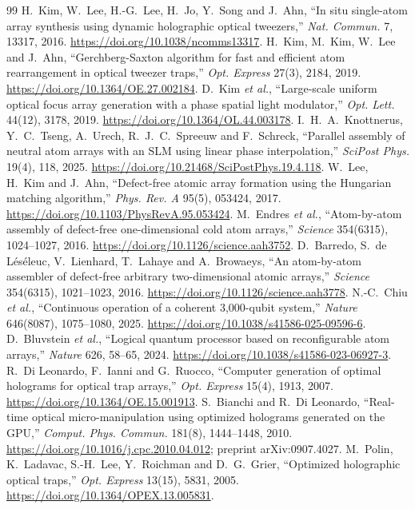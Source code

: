 \begin{thebibliography}{99}\small
{} H.~Kim, W.~Lee, H.-G.~Lee, H.~Jo, Y.~Song and J.~Ahn, ``In situ single-atom array synthesis using dynamic holographic optical tweezers,'' \emph{Nat. Commun.} 7, 13317, 2016. \url{https://doi.org/10.1038/ncomms13317}.
 H.~Kim, M.~Kim, W.~Lee and J.~Ahn, ``Gerchberg-Saxton algorithm for fast and efficient atom rearrangement in optical tweezer traps,'' \emph{Opt. Express} 27(3), 2184, 2019. \url{https://doi.org/10.1364/OE.27.002184}.
 D.~Kim \emph{et al.}, ``Large-scale uniform optical focus array generation with a phase spatial light modulator,'' \emph{Opt. Lett.} 44(12), 3178, 2019. \url{https://doi.org/10.1364/OL.44.003178}.
 I.~H.~A.~Knottnerus, Y.~C.~Tseng, A.~Urech, R.~J.~C.~Spreeuw and F.~Schreck, ``Parallel assembly of neutral atom arrays with an SLM using linear phase interpolation,'' \emph{SciPost Phys.} 19(4), 118, 2025. \url{https://doi.org/10.21468/SciPostPhys.19.4.118}.
 W.~Lee, H.~Kim and J.~Ahn, ``Defect-free atomic array formation using the Hungarian matching algorithm,'' \emph{Phys. Rev. A} 95(5), 053424, 2017. \url{https://doi.org/10.1103/PhysRevA.95.053424}.
 M.~Endres \emph{et al.}, ``Atom-by-atom assembly of defect-free one-dimensional cold atom arrays,'' \emph{Science} 354(6315), 1024--1027, 2016. \url{https://doi.org/10.1126/science.aah3752}.
 D.~Barredo, S.~de L\'es\'eleuc, V.~Lienhard, T.~Lahaye and A.~Browaeys, ``An atom-by-atom assembler of defect-free arbitrary two-dimensional atomic arrays,'' \emph{Science} 354(6315), 1021--1023, 2016. \url{https://doi.org/10.1126/science.aah3778}.
 N.-C.~Chiu \emph{et al.}, ``Continuous operation of a coherent 3,000-qubit system,'' \emph{Nature} 646(8087), 1075--1080, 2025. \url{https://doi.org/10.1038/s41586-025-09596-6}.
 D.~Bluvstein \emph{et al.}, ``Logical quantum processor based on reconfigurable atom arrays,'' \emph{Nature} 626, 58--65, 2024. \url{https://doi.org/10.1038/s41586-023-06927-3}.
 R.~Di Leonardo, F.~Ianni and G.~Ruocco, ``Computer generation of optimal holograms for optical trap arrays,'' \emph{Opt. Express} 15(4), 1913, 2007. \url{https://doi.org/10.1364/OE.15.001913}.
 S.~Bianchi and R.~Di Leonardo, ``Real-time optical micro-manipulation using optimized holograms generated on the GPU,'' \emph{Comput. Phys. Commun.} 181(8), 1444--1448, 2010. \url{https://doi.org/10.1016/j.cpc.2010.04.012}; preprint arXiv:0907.4027.
 M.~Polin, K.~Ladavac, S.-H.~Lee, Y.~Roichman and D.~G.~Grier, ``Optimized holographic optical traps,'' \emph{Opt. Express} 13(15), 5831, 2005. \url{https://doi.org/10.1364/OPEX.13.005831}.

\end{thebibliography}
